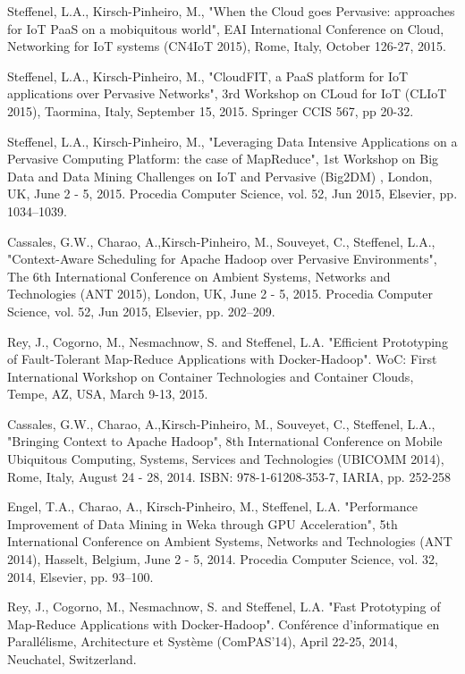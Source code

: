 \documentclass[final,twoside]{hdr} %
\begin{document}
Steffenel, L.A., Kirsch-Pinheiro, M.,  "When the Cloud goes Pervasive: approaches for IoT PaaS on a mobiquitous world",  EAI International Conference on Cloud, Networking for IoT systems (CN4IoT 2015), Rome, Italy, October 126-27, 2015. 

Steffenel, L.A., Kirsch-Pinheiro, M.,  "CloudFIT, a PaaS platform for IoT applications over Pervasive Networks",  3rd Workshop on CLoud for IoT (CLIoT 2015), Taormina, Italy, September 15, 2015. Springer CCIS 567, pp 20-32.

Steffenel, L.A., Kirsch-Pinheiro, M.,  "Leveraging Data Intensive Applications on a Pervasive Computing Platform: the case of MapReduce",  1st Workshop on Big Data and Data Mining Challenges on IoT and Pervasive (Big2DM) , London, UK, June 2 - 5, 2015. Procedia Computer Science, vol. 52, Jun 2015, Elsevier, pp. 1034–1039.  

Cassales, G.W., Charao, A.,Kirsch-Pinheiro, M., Souveyet, C., Steffenel, L.A., "Context-Aware Scheduling for Apache Hadoop over Pervasive Environments", The 6th International Conference on Ambient Systems, Networks and Technologies (ANT 2015),  London, UK, June 2 - 5, 2015. Procedia Computer Science, vol. 52, Jun 2015, Elsevier, pp. 202–209.  

Rey, J., Cogorno, M., Nesmachnow, S. and Steffenel, L.A. "Efficient Prototyping of Fault-Tolerant Map-Reduce Applications with Docker-Hadoop". WoC: First International Workshop on Container Technologies and Container Clouds,  Tempe, AZ, USA, March 9-13, 2015.

Cassales, G.W., Charao, A.,Kirsch-Pinheiro, M., Souveyet, C., Steffenel, L.A., "Bringing Context to Apache Hadoop", 8th International Conference on Mobile Ubiquitous Computing, Systems, Services and Technologies (UBICOMM 2014), Rome, Italy, August 24 - 28, 2014. ISBN: 978-1-61208-353-7, IARIA, pp. 252-258 

Engel, T.A., Charao, A., Kirsch-Pinheiro, M., Steffenel, L.A. "Performance Improvement of Data Mining in Weka through GPU Acceleration", 5th International Conference on Ambient Systems, Networks and Technologies (ANT 2014), Hasselt, Belgium, June 2 - 5, 2014. Procedia Computer Science, vol. 32, 2014, Elsevier, pp. 93–100.  

Rey, J., Cogorno, M., Nesmachnow, S. and Steffenel, L.A. "Fast Prototyping of Map-Reduce Applications with Docker-Hadoop". Conférence d’informatique en Parallélisme, Architecture et Système (ComPAS'14), April 22-25, 2014, Neuchatel, Switzerland.
\end{document}
